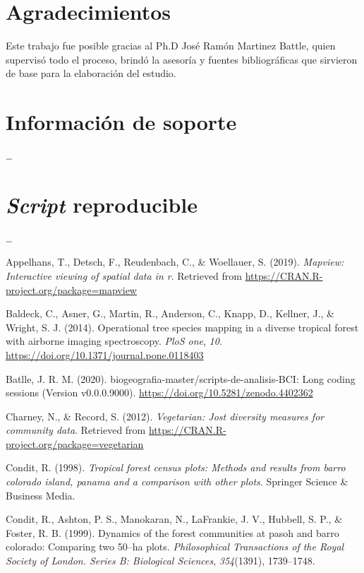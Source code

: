 \documentclass[11pt,]{article}
\begin{document}
\section{Agradecimientos}\label{agradecimientos}

Este trabajo fue posible gracias al Ph.D José Ramón Martinez Battle,
quien supervisó todo el proceso, brindó la asesoría y fuentes
bibliográficas que sirvieron de base para la elaboración del estudio.

\section{Información de soporte}\label{informaciuxf3n-de-soporte}

\ldots

\section{\texorpdfstring{\emph{Script}
reproducible}{Script reproducible}}\label{script-reproducible}

\ldots

\hypertarget{refs}{}
\hypertarget{ref-mapview}{}
Appelhans, T., Detsch, F., Reudenbach, C., \& Woellauer, S. (2019).
\emph{Mapview: Interactive viewing of spatial data in r}. Retrieved from
\url{https://CRAN.R-project.org/package=mapview}

\hypertarget{ref-inproceedings}{}
Baldeck, C., Asner, G., Martin, R., Anderson, C., Knapp, D., Kellner,
J., \& Wright, S. J. (2014). Operational tree species mapping in a
diverse tropical forest with airborne imaging spectroscopy. \emph{PloS
one}, \emph{10}. \url{https://doi.org/10.1371/journal.pone.0118403}

\hypertarget{ref-jose_ramon_martinez_batlle_2020_4402362}{}
Batlle, J. R. M. (2020). biogeografia-master/scripts-de-analisis-BCI:
Long coding sessions (Version v0.0.0.9000).
\url{https://doi.org/10.5281/zenodo.4402362}

\hypertarget{ref-vegetarian}{}
Charney, N., \& Record, S. (2012). \emph{Vegetarian: Jost diversity
measures for community data}. Retrieved from
\url{https://CRAN.R-project.org/package=vegetarian}

\hypertarget{ref-condit1998tropical}{}
Condit, R. (1998). \emph{Tropical forest census plots: Methods and
results from barro colorado island, panama and a comparison with other
plots}. Springer Science \& Business Media.

\hypertarget{ref-condit1999dynamics}{}
Condit, R., Ashton, P. S., Manokaran, N., LaFrankie, J. V., Hubbell, S.
P., \& Foster, R. B. (1999). Dynamics of the forest communities at pasoh
and barro colorado: Comparing two 50--ha plots. \emph{Philosophical
Transactions of the Royal Society of London. Series B: Biological
Sciences}, \emph{354}(1391), 1739--1748.
\end{document}

